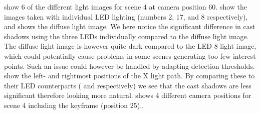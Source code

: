 \documentclass[thesis.tex]{subfiles}
\begin{document}
 show 6 of the different light images for scene 4 at camera position 60.  show the images taken with individual LED lighting (numbers 2, 17, and 8 respectively), and  shows the diffuse light image. We here notice the significant difference in cast shadows using the three LEDs individually compared to the diffuse light image. The diffuse light image is however quite dark compared to the LED 8 light image, which could potentially cause problems in some scenes generating too few interest points. Such an issue could however be handled by adapting detection thresholds.
 show the left- and rightmost positions of the X light path. By comparing these to their LED counterparts ( and  respectively) we see that the cast shadows are less significant therefore looking more natural.
 shows 4 different camera positions for scene 4 including the keyframe (position 25)..
%
\end{document}

